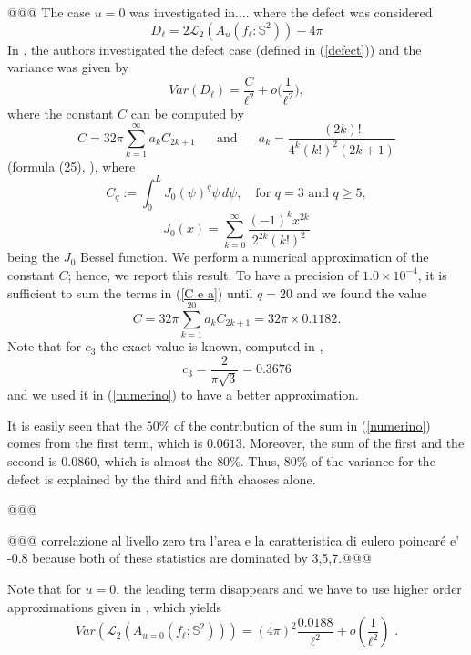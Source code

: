 \documentclass[aps,prd,showpacs,superscriptaddress,groupedaddress]{revtex4-1}  %
\begin{document}
@@@ The case $u=0$ was investigated in.... where the defect was considered $$D_\ell=2 \mathcal{L}_2(A_u(f_\ell: \mathbb{S}^2))-4\pi$$
In \cite{M e W 2011bis}, the authors investigated the defect case (defined in (\ref{defect})) and the variance was given by 
\begin{equation}\label{defect var}
Var(D_\ell)=\dfrac{C}{\ell^2}+o\bigg(\dfrac{1}{\ell^2}\bigg),
\end{equation} 
where the constant $C$ can be computed by
\begin{equation}\label{C e a}
C=32\pi \sum_{k=1}^{\infty} a_k C_{2k+1} \mbox{ } \mbox{ } \mbox{ and } \mbox{ } \mbox{ } a_k=\dfrac{(2k)!}{4^k (k!)^2(2k+1)}
\end{equation}
(formula (25), \cite{MW2012}), where
$$C_q:=  \int_{0}^{L} J_0(\psi)^q \psi \,d\psi, \mbox{  } \mbox{ for } q=3 \mbox{ and }q\geq 5,$$
\begin{equation}\label{J0}
 J_0(x)=\sum_{k=0}^{\infty} \dfrac{(-1)^kx^{2k}}{2^{2k}(k!)^2}
\end{equation} being the $J_0$ Bessel function.
We perform a numerical approximation of the constant $C$; hence, we report this result. To have a precision of $1.0\times10^{-4}$, it is sufficient to sum the terms in (\ref{C e a}) until $q=20$ and we found the value
\begin{equation}\label{numerino}
C=32\pi \sum_{k=1}^{20} a_k C_{2k+1}= 32\pi \times 0.1182.
\end{equation}
Note that for $c_3$ the exact value is known, computed in \cite{}, $$c_3=\dfrac{2}{\pi \sqrt{3}}=0.3676$$ and we used it in (\ref{numerino}) to have a better approximation.


\begin{oss}
	It is easily seen that the $50\%$ of the contribution of the sum in (\ref{numerino}) comes from the first term, which is $0.0613$. Moreover, the sum of the first and the second is $0.0860$, which is almost the $80\%$. Thus, $80\%$ of the variance for the defect is explained by the third and fifth chaoses alone.
\end{oss}

@@@

@@@ correlazione al livello zero tra l'area e la caratteristica di eulero poincar\'e e' -0.8 because both of these statistics are dominated by 3,5,7.@@@

Note that for $u=0$, the leading term disappears and we have to use higher order approximations given in \cite{}, which yields 
\begin{equation}
    Var\left( \mathcal{L}_{2}(A_{u=0}(f_{\ell };\mathbb{S}^{2})) \right) =  (4\pi)^2 \frac{0.0188}{\ell^2} + o(\frac{1}{\ell^2}) \text{ .}
\end{equation}
\end{document}

